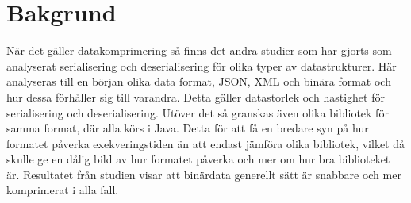 \section{Bakgrund}
\label{sec:tim-background}
När det gäller datakomprimering så finns det andra studier som har gjorts som analyserat serialisering och deserialisering för olika typer av datastrukturer\cite{serialization}. Här analyseras till en början olika data format, JSON, XML och binära format och hur dessa förhåller sig till varandra. Detta gäller datastorlek och hastighet för serialisering och deserialisering. Utöver det så granskas även olika bibliotek för samma format, där alla körs i Java. Detta för att få en bredare syn på hur formatet påverka exekveringstiden än att endast jämföra olika bibliotek, vilket då skulle ge en dålig bild av hur formatet påverka och mer om hur bra biblioteket är. Resultatet från studien visar att binärdata generellt sätt är snabbare och mer komprimerat i alla fall.
